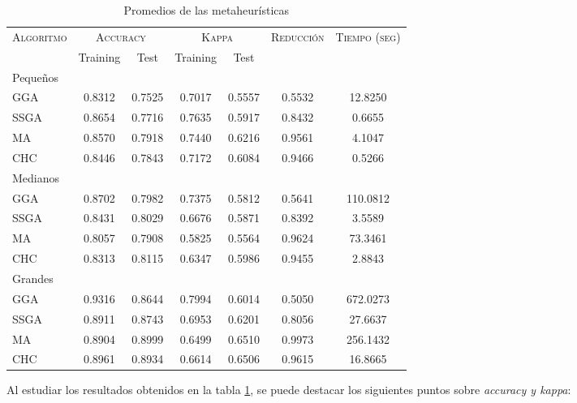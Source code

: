 \begin{table}[h!]
\centering
\begin{tabular}{l c c c c c c}
\hline
\multirow{2}{*}{\textsc{Algoritmo}}
	& \multicolumn{2}{c}{\textsc{Accuracy}}
	& \multicolumn{2}{c}{\textsc{Kappa}}
	& \textsc{Reducción}
	& \textsc{Tiempo (seg)} \\
	& Training & Test
	& Training & Test \\ 
\hline
\hline

Pequeños\\
GGA  & 0.8312 & 0.7525 & 0.7017 & 0.5557 & 0.5532 & 12.8250 \\
SSGA & 0.8654 & 0.7716 & 0.7635 & 0.5917 & 0.8432 & 0.6655 \\
MA   & 0.8570 & 0.7918 & 0.7440 & 0.6216 & 0.9561 & 4.1047 \\
CHC & 0.8446 & 0.7843 & 0.7172 & 0.6084 & 0.9466 & 0.5266 \\

\hline

Medianos\\
GGA  & 0.8702 & 0.7982 & 0.7375 & 0.5812 & 0.5641 & 110.0812 \\
SSGA & 0.8431 & 0.8029 & 0.6676 & 0.5871 & 0.8392 & 3.5589 \\
MA   & 0.8057 & 0.7908 & 0.5825 & 0.5564 & 0.9624 & 73.3461 \\
CHC  & 0.8313 & 0.8115 & 0.6347 & 0.5986 & 0.9455 & 2.8843 \\

\hline
Grandes\\
GGA  & 0.9316 & 0.8644 & 0.7994 & 0.6014 & 0.5050 & 672.0273 \\
SSGA & 0.8911 & 0.8743 & 0.6953 & 0.6201 & 0.8056 & 27.6637 \\
MA   & 0.8904 & 0.8999 & 0.6499 & 0.6510 & 0.9973 & 256.1432 \\
CHC  & 0.8961 & 0.8934 & 0.6614 & 0.6506 & 0.9615 & 16.8665 \\

\hline
\end{tabular}
\caption{Promedios de las metaheurísticas}
\label{meta}
\end{table}

Al estudiar los resultados obtenidos en la tabla \ref{meta}, se puede destacar los siguientes puntos sobre \emph{accuracy y kappa}:

